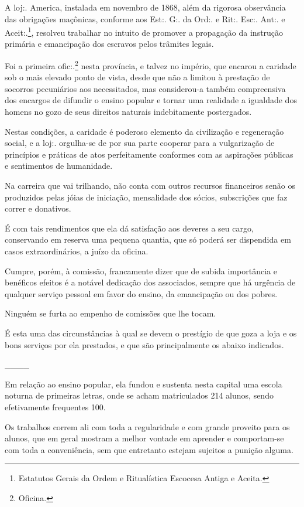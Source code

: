 A loj:. America, instalada em novembro de 1868, além da rigorosa
observância das obrigações maçônicas, conforme aos Est:. G:. da Ord:. e
Rit:. Esc:. Ant:. e Aceit:.\footnote{ Estatutos Gerais da Ordem e
  Ritualística Escocesa Antiga e Aceita.}, resolveu trabalhar no intuito
de promover a propagação da instrução primária e emancipação dos
escravos pelos trâmites legais.

Foi a primeira ofic:.\footnote{ Oficina.} nesta província, e talvez no
império, que encarou a caridade sob o mais elevado ponto de vista, desde
que não a limitou à prestação de socorros pecuniários aos necessitados,
mas considerou-a também compreensiva dos encargos de difundir o ensino
popular e tornar uma realidade a igualdade dos homens no gozo de seus
direitos naturais indebitamente postergados.

Nestas condições, a caridade é poderoso elemento da civilização e
regeneração social, e a loj:. orgulha-se de por sua parte cooperar para
a vulgarização de princípios e práticas de atos perfeitamente conformes
com as aspirações públicas e sentimentos de humanidade.

Na carreira que vai trilhando, não conta com outros recursos financeiros
senão os produzidos pelas jóias de iniciação, mensalidade dos sócios,
subscrições que faz correr e donativos.

É com tais rendimentos que ela dá satisfação aos deveres a seu cargo,
conservando em reserva uma pequena quantia, que só poderá ser dispendida
em casos extraordinários, a juízo da oficina.

Cumpre, porém, à comissão, francamente dizer que de subida importância e
benéficos efeitos é a notável dedicação dos associados, sempre que há
urgência de qualquer serviço pessoal em favor do ensino, da emancipação
ou dos pobres.

Ninguém se furta ao empenho de comissões que lhe tocam.

É esta uma das circunstâncias à qual se devem o prestígio de que goza a
loja e os bons serviços por ela prestados, e que são principalmente os
abaixo indicados.

\_\_\_\_

Em relação ao ensino popular, ela fundou e sustenta nesta capital uma
escola noturna de primeiras letras, onde se acham matriculados 214
alunos, sendo efetivamente frequentes 100.

Os trabalhos correm ali com toda a regularidade e com grande proveito
para os alunos, que em geral mostram a melhor vontade em aprender e
comportam-se com toda a conveniência, sem que entretanto estejam
sujeitos a punição alguma.

